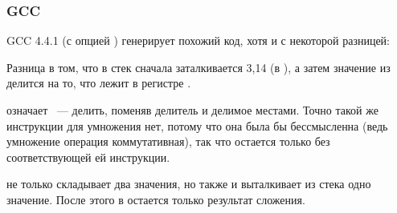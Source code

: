 \subsubsection{GCC}

GCC 4.4.1 (с опцией \Othree) генерирует похожий код, хотя и с некоторой разницей:



Разница в том, что в стек сначала заталкивается 3,14 (в ), а затем значение 
из  делится на то, что лежит в регистре .

\FDIVR означает ~--- делить, поменяв делитель и делимое местами. 
Точно такой же инструкции для умножения нет, потому что она была бы бессмысленна (ведь умножение 
операция коммутативная), так что остается только \FMUL без соответствующей ей  инструкции.

\FADDP не только складывает два значения, но также и выталкивает из стека одно значение. 
После этого в  остается только результат сложения.
